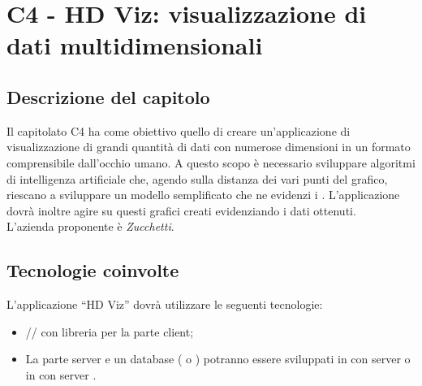 \section{C4 - HD Viz: visualizzazione di dati multidimensionali}

\subsection{Descrizione del capitolo}
Il capitolato C4 ha come obiettivo quello di creare un'applicazione di visualizzazione di grandi quantità di dati con numerose dimensioni in un formato comprensibile dall'occhio umano. A questo scopo è necessario sviluppare algoritmi di intelligenza artificiale che, agendo sulla distanza dei vari punti del grafico, riescano a sviluppare un modello semplificato che ne evidenzi i . 
L'applicazione dovrà inoltre agire su questi grafici creati evidenziando i dati ottenuti.\\
L'azienda proponente è \textit{Zucchetti}.

\subsection{Tecnologie coinvolte}
L'applicazione “HD Viz” dovrà utilizzare le seguenti tecnologie:
\begin{itemize}
\item {}// con libreria  per la parte client;
\item La parte server e un database ( o ) potranno essere sviluppati in  con server  o in  con server .
\end{itemize}


